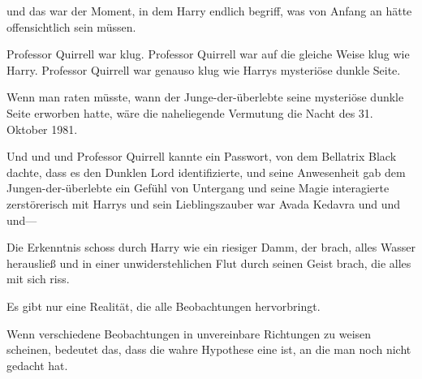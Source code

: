 und das war der Moment, in dem Harry endlich begriff, was von Anfang an hätte offensichtlich sein müssen.

\later

Professor Quirrell war klug.
Professor Quirrell war auf die gleiche Weise klug wie Harry.
Professor Quirrell war genauso klug wie Harrys mysteriöse dunkle Seite.

Wenn man raten müsste, wann der Junge-der-überlebte seine mysteriöse dunkle Seite erworben hatte, wäre die naheliegende Vermutung die Nacht des 31. Oktober 1981.

\later

Und und und Professor Quirrell kannte ein Passwort, von dem Bellatrix Black dachte, dass es den Dunklen Lord identifizierte, und seine Anwesenheit gab dem Jungen-der-überlebte ein Gefühl von Untergang und seine Magie interagierte zerstörerisch mit Harrys und sein Lieblingszauber war Avada Kedavra und und und—

Die Erkenntnis schoss durch Harry wie ein riesiger Damm, der brach, alles Wasser herausließ und in einer unwiderstehlichen Flut durch seinen Geist brach, die alles mit sich riss.

Es gibt nur eine Realität, die alle Beobachtungen hervorbringt.

Wenn verschiedene Beobachtungen in unvereinbare Richtungen zu weisen scheinen, bedeutet das, dass die wahre Hypothese eine ist, an die man noch nicht gedacht hat.

